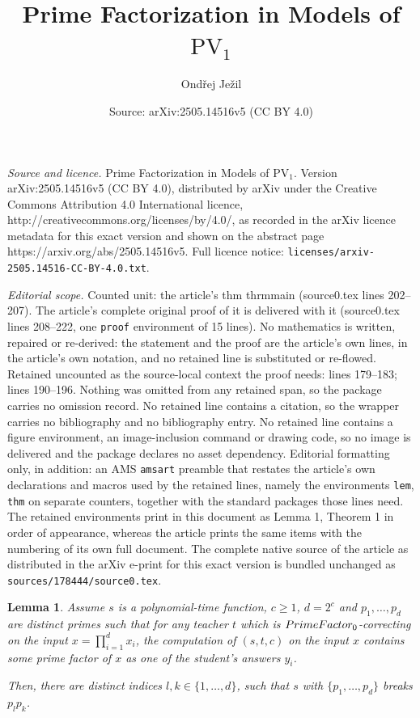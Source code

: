 \documentclass[10pt,a4paper]{amsart}
\title{Prime Factorization in Models of $\text{PV}_1$}
\author{Ondřej Ježil}
\date{Source: arXiv:2505.14516v5 (CC BY 4.0)}
\newtheorem{lem}{Lemma}
\newcommand{\PrimeFactor}{\textsc{PrimeFactor}}
\begin{document}
\maketitle

\noindent\emph{Source and licence.} Prime Factorization in Models of $\text{PV}_1$. Version arXiv:2505.14516v5 (CC BY 4.0), distributed by arXiv under the Creative Commons Attribution 4.0 International licence, http://creativecommons.org/licenses/by/4.0/, as recorded in the arXiv licence metadata for this exact version and shown on the abstract page https://arxiv.org/abs/2505.14516v5. Full licence notice: \texttt{licenses/arxiv-2505.14516-CC-BY-4.0.txt}.\par\smallskip

\noindent\textit{Editorial scope.} Counted unit: the article's thm thrmmain (source0.tex lines 202--207). The article's complete original proof of it is delivered with it (source0.tex lines 208--222, one \texttt{proof} environment of 15 lines). No mathematics is written, repaired or re-derived: the statement and the proof are the article's own lines, in the article's own notation, and no retained line is substituted or re-flowed.  Retained uncounted as the source-local context the proof needs: lines 179--183; lines 190--196.  Nothing was omitted from any retained span, so the package carries no omission record.  No retained line contains a citation, so the wrapper carries no bibliography and no bibliography entry.  No retained line contains a figure environment, an image-inclusion command or drawing code, so no image is delivered and the package declares no asset dependency.  Editorial formatting only, in addition: an AMS \texttt{amsart} preamble that restates the article's own declarations and macros used by the retained lines, namely the environments \texttt{lem}, \texttt{thm} on separate counters, together with the standard packages those lines need.  The retained environments print in this document as Lemma 1, Theorem 1 in order of appearance, whereas the article prints the same items with the numbering of its own full document.  The complete native source of the article as distributed in the arXiv e-print for this exact version is bundled unchanged as \texttt{sources/178444/source0.tex}.
\begin{lem}\label{lemmabreak}
    Assume $s$ is a polynomial-time function, $c\geq 1$, $d=2^c$ and $p_1,\dots,p_d$ are distinct primes such that for any teacher $t$ which is $\PrimeFactor_0$-correcting on the input $x=\prod_{i=1}^d x_i$, the computation of $(s,t,c)$ on the input $x$ contains some prime factor of $x$ as one of the student's answers $y_i$.
    
    Then, there are distinct indices $l,k\in \{1,\dots,d\}$, such that $s$ with $\{p_1,\dots,p_d\}$ breaks $p_lp_k$. 
\end{lem}
\end{document}
